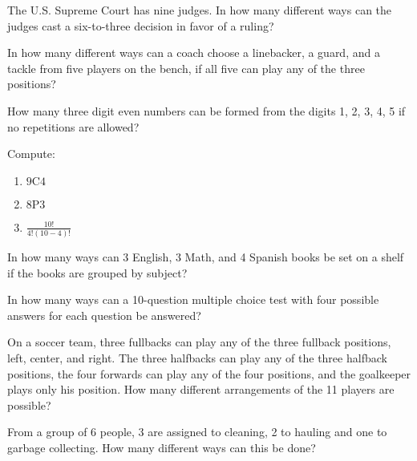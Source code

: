 \begin{puzzle}
    The U.S. Supreme Court has nine judges. In how many different ways can the judges cast a six-to-three decision in favor of a ruling?
\end{puzzle}

\begin{puzzle}
    In how many different ways can a coach choose a linebacker, a guard, and a tackle from five players on the bench, if all five can play any of the three positions?
\end{puzzle}

\begin{puzzle}
    How many three digit even numbers can be formed from the digits 1, 2, 3, 4, 5 if no repetitions are allowed?
\end{puzzle}

\begin{puzzle}
    Compute:
    \begin{enumerate}
        \item \( \text{9C4} \)
        \item \( \text{8P3} \)
        \item \( \frac{10!}{4!(10-4)!} \)
    \end{enumerate}
\end{puzzle}

\begin{puzzle}
    In how many ways can 3 English, 3 Math, and 4 Spanish books be set on a shelf if the books are grouped by subject?
\end{puzzle}

\begin{puzzle}
    In how many ways can a 10-question multiple choice test with four possible answers for each question be answered?
\end{puzzle}

\begin{puzzle}
    On a soccer team, three fullbacks can play any of the three fullback positions, left, center, and right. The three halfbacks can play any of the three halfback positions, the four forwards can play any of the four positions, and the goalkeeper plays only his position. How many different arrangements of the 11 players are possible?
\end{puzzle}

\begin{puzzle}
    From a group of 6 people, 3 are assigned to cleaning, 2 to hauling and one to garbage collecting. How many different ways can this be done?
\end{puzzle}

